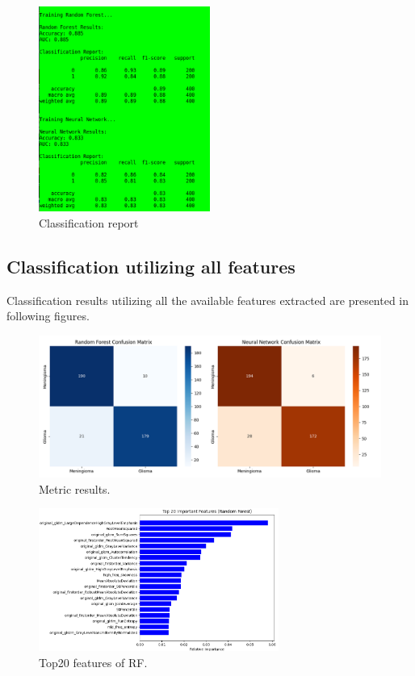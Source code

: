 \documentclass[11pt,a4paper]{article}
\begin{document}
		\begin{figure}[H]
			\centering
			\includegraphics[width=0.5\textwidth]{images/report_freq.png}
			\caption{Classification report}
			\label{fig1:}
		\end{figure}		


	\subsection{Classification utilizing all features}

		Classification results utilizing all the available features extracted are presented in following figures.
		\begin{figure}[H]
			\centering
			\includegraphics[width=1.1\textwidth]{images/Metrics_all_features.png}
			\caption{Metric results.}
			\label{fig1:}
		\end{figure}		

		\begin{figure}[H]
			\centering
			\includegraphics[width=0.7\textwidth]{images/top20features_all_features_rf.png}
			\caption{Top20 features of RF.}
			\label{fig1:}
		\end{figure}		
\end{document}
